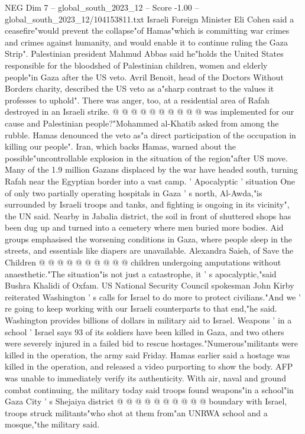 \begin{textsample}{NEG Dim 7 – global\_south\_2023\_12 – Score -1.00 – global\_south\_2023\_12/104153811.txt}
Israeli Foreign Minister Eli Cohen said a ceasefire"would prevent the collapse"of Hamas"which is committing war crimes and crimes against humanity, and would enable it to continue ruling the Gaza Strip".
Palestinian president Mahmud Abbas said he"holds the United States responsible for the bloodshed of Palestinian children, women and elderly people"in Gaza after the US veto.
Avril Benoit, head of the Doctors Without Borders charity, described the US veto as a"sharp contrast to the values it professes to uphold".
There was anger, too, at a residential area of Rafah destroyed in an Israeli strike. @ @ @ @ @ @ @ @ @ @ was implemented for our cause and Palestinian people?"Mohammed al-Khatib asked from among the rubble.
Hamas denounced the veto as"a direct participation of the occupation in killing our people".
Iran, which backs Hamas, warned about the possible"uncontrollable explosion in the situation of the region"after US move.
Many of the 1.9 million Gazans displaced by the war have headed south, turning Rafah near the Egyptian border into a vast camp. ' Apocalyptic ' situation One of only two partially operating hospitals in Gaza ' s north, Al-Awda,"is surrounded by Israeli troops and tanks, and fighting is ongoing in its vicinity", the UN said.
Nearby in Jabalia district, the soil in front of shuttered shops has been dug up and turned into a cemetery where men buried more bodies.
Aid groups emphasised the worsening conditions in Gaza, where people sleep in the streets, and essentials like diapers are unavailable.
Alexandra Saieh, of Save the Children @ @ @ @ @ @ @ @ @ @ children undergoing amputations without anaesthetic."The situation"is not just a catastrophe, it ' s apocalyptic,"said Bushra Khalidi of Oxfam.
US National Security Council spokesman John Kirby reiterated Washington ' s calls for Israel to do more to protect civilians."And we ' re going to keep working with our Israeli counterparts to that end,"he said.
Washington provides billions of dollars in military aid to Israel.
Weapons ' in a school ' Israel says 93 of its soldiers have been killed in Gaza, and two others were severely injured in a failed bid to rescue hostages."Numerous"militants were killed in the operation, the army said Friday.
Hamas earlier said a hostage was killed in the operation, and released a video purporting to show the body.
AFP was unable to immediately verify its authenticity.
With air, naval and ground combat continuing, the military today said troops found weapons"in a school"in Gaza City ' s Shejaiya district @ @ @ @ @ @ @ @ @ @ boundary with Israel, troops struck militants"who shot at them from"an UNRWA school and a mosque,"the military said.

\end{textsample}
